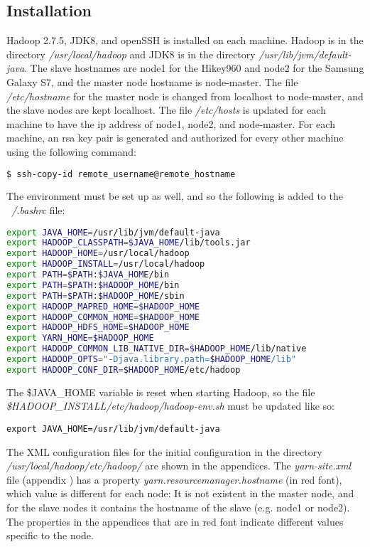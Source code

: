 \documentclass[10pt,journal,compsoc,float]{IEEEtran}
\begin{document}
\subsection{Installation}
Hadoop 2.7.5, JDK8, and openSSH is installed on each machine. Hadoop is in the directory \textit{/usr/local/hadoop} and JDK8 is in the directory \textit{/usr/lib/jvm/default-java}. The slave hostnames are node1 for the Hikey960 and node2 for the Samsung Galaxy S7, and the master node hostname is node-master. The file \textit{/etc/hostname} for the master node is changed from localhost to node-master, and the slave nodes are kept localhost. The file \textit{/etc/hosts} is updated for each machine to have the ip address of node1, node2, and node-master. For each machine, an rsa key pair is generated and authorized for every other machine using the following command: 
\begin{lstlisting}[language=bash, otherkeywords={$}]
$ ssh-copy-id remote_username@remote_hostname
\end{lstlisting}

The environment must be set up as well, and so the following is added to the \textit{~/.bashrc} file:
\begin{lstlisting}[language=bash, deletekeywords={local}]
export JAVA_HOME=/usr/lib/jvm/default-java
export HADOOP_CLASSPATH=$JAVA_HOME/lib/tools.jar
export HADOOP_HOME=/usr/local/hadoop
export HADOOP_INSTALL=/usr/local/hadoop
export PATH=$PATH:$JAVA_HOME/bin
export PATH=$PATH:$HADOOP_HOME/bin
export PATH=$PATH:$HADOOP_HOME/sbin
export HADOOP_MAPRED_HOME=$HADOOP_HOME
export HADOOP_COMMON_HOME=$HADOOP_HOME
export HADOOP_HDFS_HOME=$HADOOP_HOME
export YARN_HOME=$HADOOP_HOME
export HADOOP_COMMON_LIB_NATIVE_DIR=$HADOOP_HOME/lib/native
export HADOOP_OPTS="-Djava.library.path=$HADOOP_HOME/lib"
export HADOOP_CONF_DIR=$HADOOP_HOME/etc/hadoop
\end{lstlisting}

The \$JAVA\_HOME variable is reset when starting Hadoop, so the file \textit{\$HADOOP\_INSTALL/etc/hadoop/hadoop-env.sh} must be updated like so:
\begin{lstlisting}
export JAVA_HOME=/usr/lib/jvm/default-java
\end{lstlisting}

The XML configuration files for the initial configuration in the directory \textit{/usr/local/hadoop/etc/hadoop/} are shown in the appendices. The \textit{yarn-site.xml} file (appendix ) has a property \textit{yarn.resourcemanager.hostname} (in red font), which value is different for each node: It is not existent in the master node, and for the slave nodes it contains the hostname of the slave (e.g. node1 or node2). The properties in the appendices that are in red font indicate different values specific to the node.
\end{document}
